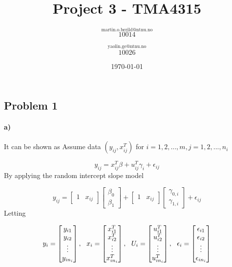 \documentclass[
]{article}
\title{Project 3 - TMA4315}
\author{\(\overset{\mathrm{martin.o.berild@ntnu.no}}{10014}\)
\and \(\overset{\mathrm{yaolin.ge@ntnu.no}}{10026}\)}
\date{\today}
\begin{document}
\maketitle

\hypertarget{problem-1}{%
\subsection{Problem 1}\label{problem-1}}

\hypertarget{a}{%
\paragraph{a)}\label{a}}

It can be shown as Assume data \((y_{ij}, x_{ij}^T)\) for
\(i = 1, 2, ..., m, j = 1, 2, ..., n_i\)

\[
y_{ij} = x_{ij}^T\beta + u_{ij}^T\gamma_i + \epsilon_{ij}
\] By applying the random intercept slope model

\[
y_{ij} = \begin{bmatrix} 1 & x_{ij}\end{bmatrix} \begin{bmatrix} \beta_0 \\ \beta_1\end{bmatrix} + \begin{bmatrix} 1 & x_{ij}\end{bmatrix} \begin{bmatrix} \gamma_{0, i} \\ \gamma_{1, i}\end{bmatrix} + \epsilon_{ij}
\] Letting

\[
y_i = \begin{bmatrix} y_{i1} \\ y_{i2} \\ $\vdots$ \\ y_{in_i} \end{bmatrix}, \ \ x_i = \begin{bmatrix} x_{i1}^T \\ x_{i2}^T \\ \vdots \\ x_{in_i}^T \end{bmatrix}, \ \ U_i = \begin{bmatrix} u_{i1}^T \\ u_{i2}^T \\ \vdots \\ u_{in_i}^T \end{bmatrix}, \ \ \epsilon_i = \begin{bmatrix} \epsilon_{i1} \\ \epsilon_{i2} \\ $\vdots$ \\ \epsilon_{in_i} \end{bmatrix}
\]
\end{document}
